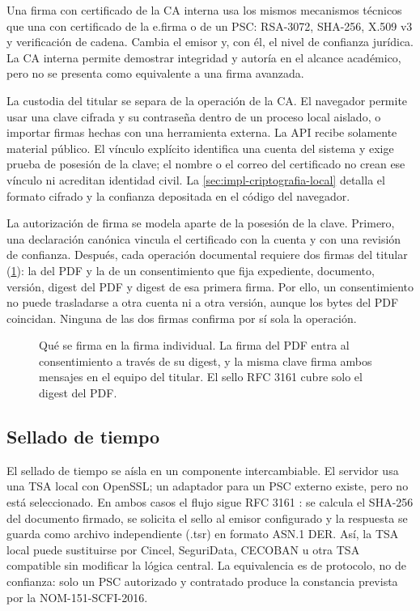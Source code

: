 Una firma con certificado de la CA interna usa los mismos mecanismos técnicos que una con certificado de la e.firma o de un PSC: RSA-3072, SHA-256, X.509 v3 y verificación de cadena. Cambia el emisor y, con él, el nivel de confianza jurídica. La CA interna permite demostrar integridad y autoría en el alcance académico, pero no se presenta como equivalente a una firma avanzada.

La custodia del titular se separa de la operación de la CA. El navegador permite usar una clave cifrada y su contraseña dentro de un proceso local aislado, o importar firmas hechas con una herramienta externa. La API recibe solamente material público. El vínculo explícito identifica una cuenta del sistema y exige prueba de posesión de la clave; el nombre o el correo del certificado no crean ese vínculo ni acreditan identidad civil. La \cref{sec:impl-criptografia-local} detalla el formato cifrado y la confianza depositada en el código del navegador.

La autorización de firma se modela aparte de la posesión de la clave. Primero, una declaración canónica vincula el certificado con la cuenta y con una revisión de confianza. Después, cada operación documental requiere dos firmas del titular (\cref{fig:cripto-consentimiento}): la del PDF y la de un consentimiento que fija expediente, documento, versión, digest del PDF y digest de esa primera firma. Por ello, un consentimiento no puede trasladarse a otra cuenta ni a otra versión, aunque los bytes del PDF coincidan. Ninguna de las dos firmas confirma por sí sola la operación.

\begin{figure}[!htbp]
  \centering
  
  \caption{Qué se firma en la firma individual. La firma del PDF entra al consentimiento a través de su digest, y la misma clave firma ambos mensajes en el equipo del titular. El sello RFC 3161 cubre solo el digest del PDF.}
  \label{fig:cripto-consentimiento}
\end{figure}

\subsection{Sellado de tiempo}\label{sec:sellado-tiempo}

El sellado de tiempo se aísla en un componente intercambiable. El servidor usa una TSA local con OpenSSL; un adaptador para un PSC externo existe, pero no está seleccionado. En ambos casos el flujo sigue RFC 3161 \cite{adams2001}: se calcula el SHA-256 del documento firmado, se solicita el sello al emisor configurado y la respuesta se guarda como archivo independiente (.tsr) en formato ASN.1 DER. Así, la TSA local puede sustituirse por Cincel, SeguriData, CECOBAN u otra TSA compatible sin modificar la lógica central. La equivalencia es de protocolo, no de confianza: solo un PSC autorizado y contratado produce la constancia prevista por la NOM-151-SCFI-2016.

